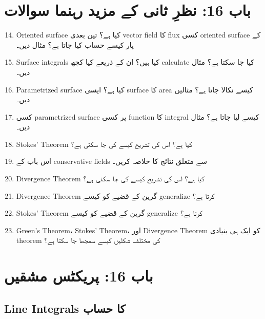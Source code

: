 \begin{enumerate}

\section*{باب 16: نظرِ ثانی کے مزید رہنما سوالات}

\begin{enumerate}
\setcounter{enumi}{13}

\item Oriented surface کیا ہے؟ تین بعدی vector field کا flux کسی oriented surface کے پار کیسے حساب کیا جاتا ہے؟ مثال دیں۔

\item Surface integrals کیا ہیں؟ ان کے ذریعے کیا کچھ calculate کیا جا سکتا ہے؟ مثال دیں۔

\item Parametrized surface کیا ہے؟ ایسی surface کا area کیسے نکالا جاتا ہے؟ مثالیں دیں۔

\item کسی parametrized surface پر کسی function کا integral کیسے لیا جاتا ہے؟ مثال دیں۔

\item Stokes’ Theorem کیا ہے؟ اس کی تشریح کیسے کی جا سکتی ہے؟

\item اس باب کے conservative fields سے متعلق نتائج کا خلاصہ کریں۔

\item Divergence Theorem کیا ہے؟ اس کی تشریح کیسے کی جا سکتی ہے؟

\item Divergence Theorem گرین کے قضیے کو کیسے generalize کرتا ہے؟

\item Stokes’ Theorem گرین کے قضیے کو کیسے generalize کرتا ہے؟

\item Green’s Theorem، Stokes’ Theorem، اور Divergence Theorem کو ایک ہی بنیادی theorem کی مختلف شکلیں کیسے سمجھا جا سکتا ہے؟
\end{enumerate}


\section*{باب 16: پریکٹس مشقیں}

\subsection*{Line Integrals کا حساب}


\end{enumerate}

